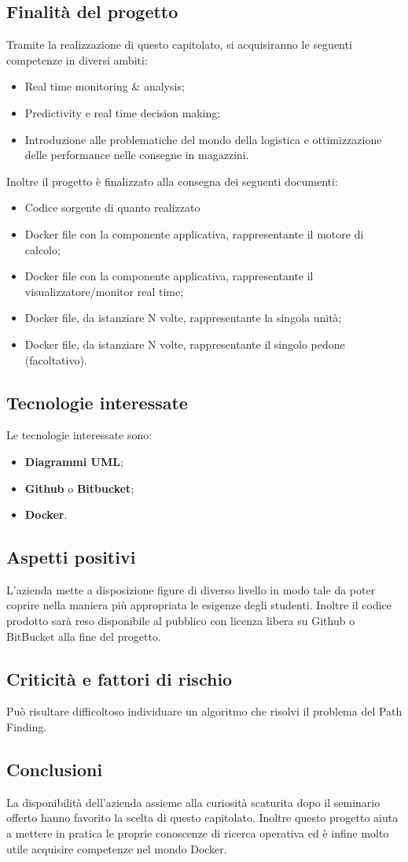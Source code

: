 \subsection{Finalità del progetto}
Tramite la realizzazione di questo capitolato, si acquisiranno le seguenti competenze in diversi ambiti:
\begin{itemize}
	\item Real time monitoring \& analysis;
	\item Predictivity e real time decision making;
	\item Introduzione alle problematiche del mondo della logistica e ottimizzazione delle performance nelle consegne in magazzini.
\end{itemize}
Inoltre il progetto è finalizzato alla consegna dei seguenti documenti:
\begin{itemize}
	\item Codice sorgente di quanto realizzato
	\item Docker file con la componente applicativa, rappresentante il motore di calcolo;
	\item Docker file con la componente applicativa, rappresentante il visualizzatore/monitor real time;
	\item Docker file, da istanziare N volte, rappresentante la singola unità;
	\item Docker file, da istanziare N volte, rappresentante il singolo pedone (facoltativo).
\end{itemize}
\subsection{Tecnologie interessate}
Le tecnologie interessate sono:
\begin{itemize}
	\item \textbf{Diagrammi UML};
	\item \textbf{Github} o \textbf{Bitbucket};
	\item \textbf{Docker}.
\end{itemize}
\subsection{Aspetti positivi}
L'azienda mette a disposizione figure di diverso livello in modo tale da poter coprire nella maniera più appropriata le esigenze degli studenti.
Inoltre il codice prodotto sarà reso disponibile al pubblico con licenza libera su Github o BitBucket alla fine del progetto.
\subsection{Criticità e fattori di rischio}
Può risultare difficoltoso individuare un algoritmo che risolvi il problema del Path Finding.
\subsection{Conclusioni}
La disponibilità dell'azienda assieme alla curiosità scaturita dopo il seminario offerto hanno favorito la scelta di questo capitolato.
Inoltre questo progetto aiuta a mettere in pratica le proprie conoscenze di ricerca operativa ed è infine molto utile acquisire competenze nel mondo Docker.